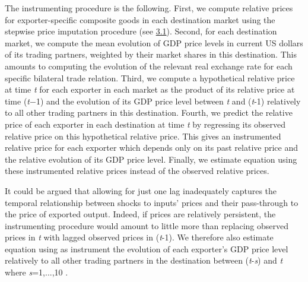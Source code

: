 \documentclass[12pt,twoside,a4paper,notitlepage]{article}
\begin{document}
The instrumenting procedure is the following. First, we compute relative prices for exporter-specific composite goods in each destination market using the stepwise price imputation procedure (see {\hyperref[ref-004]{3.1}}). Second, for each destination market, we compute the mean evolution of GDP price levels in current US dollars of its trading partners, weighted by their market shares in this destination. This amounts to computing the evolution of the relevant real exchange rate for each specific bilateral trade relation. Third, we compute a hypothetical relative price at time \textit{t} for each exporter in each market as the product of its relative price at time (\textit{t}${-}$1) and the evolution of its GDP price level between \textit{t} and (\textit{t}-1) relatively to all other trading partners in this destination. Fourth, we predict the relative price of each exporter in each destination at time \textit{t} by regressing its observed relative price on this hypothetical relative price. This gives an instrumented relative price for each exporter which depends only on its past relative price and the relative evolution of its GDP price level. Finally, we estimate equation {\hyperref[ref-002]{ }} using these instrumented relative prices instead of the observed relative prices.

It could be argued that allowing for just one lag inadequately captures the temporal relationship between shocks to inputs' prices and their pass-through to the price of exported output. Indeed, if prices are relatively persistent, the instrumenting procedure would amount to little more than replacing observed prices in \textit{t} with lagged observed prices in (\textit{t}-1). We therefore also estimate equation {\hyperref[ref-002]{ }} using as instrument the evolution of each exporter's GDP price level relatively to all other trading partners in the destination between (\textit{t}-\textit{s}) and \textit{t} where \textit{s}=1,...,10%
.
\end{document}
